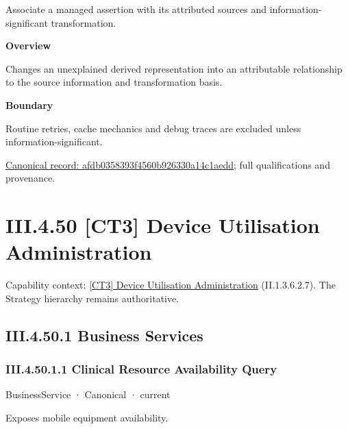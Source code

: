 Associate a managed assertion with its attributed sources and information-significant transformation.



\textbf{Overview}



Changes an unexplained derived representation into an attributable relationship to the source information and transformation basis.



\textbf{Boundary}



Routine retries, cache mechanics and debug traces are excluded unless information-significant.


{\footnotesize \href{../../../../continuum/business/business-function/afdb0358393f4560b926330a14c1aedd.md}{Canonical record: afdb0358393f4560b926330a14c1aedd}; full qualifications and provenance.}\par
\section*{III.4.50 [CT3] Device Utilisation Administration}
\label{navigation:III.4.50}

{\small Capability context: \hyperref[element:1a3732b5911c45b3aece38b2db2d0f15]{[CT3] Device Utilisation Administration} (II.1.3.6.2.7). The Strategy hierarchy remains authoritative.}\par
\subsection*{III.4.50.1 Business Services}
\label{navigation:III.4.50.1}

\subsubsection*{III.4.50.1.1 Clinical Resource Availability Query}
\label{navigation:III.4.50.1.1}

\label{element:0e5ed162a288425aad2833ed5e07ed64}
{\small BusinessService · Canonical · current}\par

Exposes mobile equipment availability.


